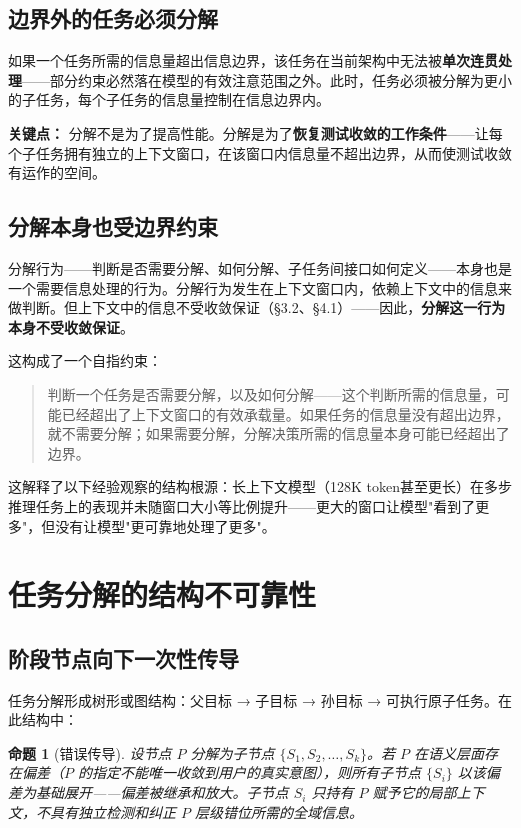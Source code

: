 \documentclass[11pt,a4paper]{ctexart}
\newtheorem{proposition}[theorem]{命题}
\begin{document}
\subsection{边界外的任务必须分解}

如果一个任务所需的信息量超出信息边界，该任务在当前架构中无法被\textbf{单次连贯处理}——部分约束必然落在模型的有效注意范围之外。此时，任务必须被分解为更小的子任务，每个子任务的信息量控制在信息边界内。

\textbf{关键点：} 分解不是为了提高性能。分解是为了\textbf{恢复测试收敛的工作条件}——让每个子任务拥有独立的上下文窗口，在该窗口内信息量不超出边界，从而使测试收敛有运作的空间。

\subsection{分解本身也受边界约束}

分解行为——判断是否需要分解、如何分解、子任务间接口如何定义——本身也是一个需要信息处理的行为。分解行为发生在上下文窗口内，依赖上下文中的信息来做判断。但上下文中的信息不受收敛保证（§3.2、§4.1）——因此，\textbf{分解这一行为本身不受收敛保证}。

这构成了一个自指约束：

\begin{quote}
    判断一个任务是否需要分解，以及如何分解——这个判断所需的信息量，可能已经超出了上下文窗口的有效承载量。如果任务的信息量没有超出边界，就不需要分解；如果需要分解，分解决策所需的信息量本身可能已经超出了边界。
\end{quote}

这解释了以下经验观察的结构根源：长上下文模型（128K token甚至更长）在多步推理任务上的表现并未随窗口大小等比例提升——更大的窗口让模型"看到了更多"，但没有让模型"更可靠地处理了更多"。


\section{任务分解的结构不可靠性}

\subsection{阶段节点向下一次性传导}

任务分解形成树形或图结构：父目标 → 子目标 → 孙目标 → 可执行原子任务。在此结构中：

\begin{proposition}[错误传导]
    设节点 $P$ 分解为子节点 $\{S_1, S_2, \dots, S_k\}$。若 $P$ 在语义层面存在偏差（$P$ 的指定不能唯一收敛到用户的真实意图），则所有子节点 $\{S_i\}$ 以该偏差为基础展开——偏差被继承和放大。子节点 $S_i$ 只持有 $P$ 赋予它的局部上下文，不具有独立检测和纠正 $P$ 层级错位所需的全域信息。
\end{proposition}
\end{document}
